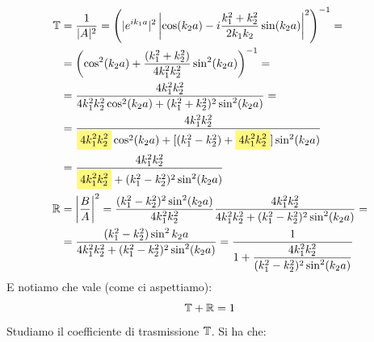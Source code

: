 \documentclass[../../FisicaTeorica.tex]{subfiles}
\begin{document}
\begin{align*}
\bb{T}&=\frac{1}{|A|^2}=\left(|e^{ik_1 a}|^2 \left|\cos(k_2 a) - i \frac{k_1^2+k_2^2}{2k_1k_2}\sin(k_2 a) \right|^2 \right)^{-1} = \\
&=\left(\cos^2(k_2a)+\frac{(k_1^2+k_2^2)}{4k_1^2k_2^2}\sin^2(k_2 a)\right)^{-1}=\\
&=\frac{4k_1^2 k_2^2}{4k_1^2 k_2^2 \cos^2 (k_2 a) + (k_1^2+k_2^2)^2\sin^2 (k_2 a)} =\\
&= \frac{4k_1^2 k_2^2}{\hlc{Yellow}{4k_1^2k_2^2} \cos^2(k_2a)+[(k_1^2-k_2^2)+\hlc{Yellow}{4k_1^2k_2^2}]\sin^2(k_2a)}\\
&=\frac{4k_1^2 k_2^2}{\hlc{Yellow}{4k_1^2 k_2^2} + (k_1^2-k_2^2)^2\sin^2(k_2a)}\\
\bb{R}&=  
\left|\frac{B}{A}\right|^2 = 
\frac{(k_1^2-k_2^2)^2 \sin^2(k_2a)}{4k_1^2 k_2^2} \frac{4k_1^2k_2^2}{4k_1^2k_2^2+(k_1^2-k_2^2)^2\sin^2(k_2a)}=\\
&=
\frac{(k_1^2-k_2^2)\sin^2 k_2 a}{4k_1^2 k_2^2 + (k_1^2-k_2^2)^2\sin^2(k_2 a)} = \frac{1}{\displaystyle 1+\frac{4k_1^2k_2^2}{(k_1^2-k_2^2)^2\sin^2(k_2a)}}
\end{align*}
E notiamo che vale (come ci aspettiamo):
\[
\mathbb{T}+\mathbb{R}=1
\]
Studiamo il coefficiente di trasmissione $\mathbb{T}$. Si ha che:
\end{document}
